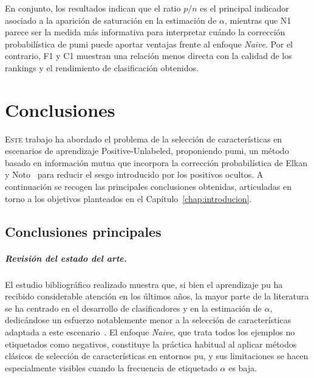 En conjunto, los resultados indican que el ratio $p/n$ es el principal indicador asociado a la aparición de saturación en la estimación de $\alpha$, mientras que N1 parece ser la medida más informativa para interpretar cuándo la corrección probabilística de \acrshort{pumi} puede aportar ventajas frente al enfoque \textit{Naive}. Por el contrario, F1 y C1 muestran una relación menos directa con la calidad de los rankings y el rendimiento de clasificación obtenidos.

\chapter{Conclusiones}
\label{chap:conclusiones}

\lettrine{E}{ste} trabajo ha abordado el problema de la selección de características en escenarios de aprendizaje Positive-Unlabeled, proponiendo \acrshort{pumi}, un método basado en información mutua que incorpora la corrección probabilística de Elkan y Noto~\cite{elkan2008learning} para reducir el sesgo introducido por los positivos ocultos. A continuación se recogen las principales conclusiones obtenidas, articuladas en torno a los objetivos planteados en el Capítulo~\ref{chap:introducion}.

\section{Conclusiones principales}
\label{sec:conclusiones_principales}

\paragraph{Revisión del estado del arte.}
El estudio bibliográfico realizado muestra que, si bien el aprendizaje \acrshort{pu} ha recibido considerable atención en los últimos años, la mayor parte de la literatura se ha centrado en el desarrollo de clasificadores y en la estimación de $\alpha$, dedicándose un esfuerzo notablemente menor a la selección de características adaptada a este escenario~\cite{bekker2020learning}. El enfoque \textit{Naive}, que trata todos los ejemplos no etiquetados como negativos, constituye la práctica habitual al aplicar métodos clásicos de selección de características en entornos \acrshort{pu}, y sus limitaciones se hacen especialmente visibles cuando la frecuencia de etiquetado $\alpha$ es baja.

